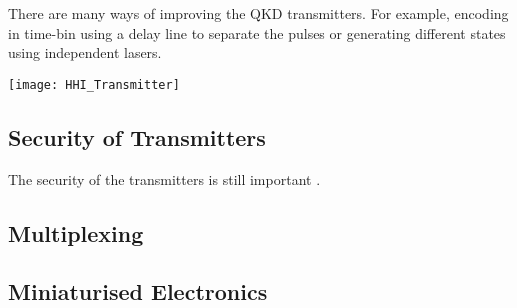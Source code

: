There are many ways of improving the QKD transmitters. For example, encoding in time-bin using a delay line to separate the pulses or generating different states using independent lasers.

\begin{sidewaysfigure}
	\centering
	\texttt{[image: HHI\_Transmitter]}
	\caption[Latest generation InP QKD Transmitter]{Latest generation HHI indium phosphide transmitter. The \SI[product-units=power]{6x4}{mm} chip contains a few ways to create BB84 states for QKD. Firstly, we have designs to compare \ac{dfb} and \ac{DBR} lasers. Secondly, we can use a delay line to separate the time bins. Finally, we have multiplexed lasers to pulse independently lasers for each state.}
\end{sidewaysfigure}

\subsection{Security of Transmitters}

The security of the transmitters is still important \cite{makarov2019}.

\subsection{Multiplexing}

\subsection{Miniaturised Electronics}


